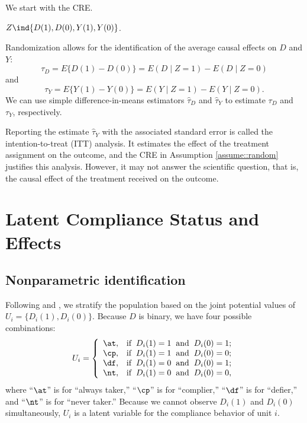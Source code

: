 We start with the CRE. 
\begin{assumption}[randomization]
\label{assume::random}
$Z\ind \{D(1), D(0) ,Y(1), Y(0)   \}$. 
\end{assumption}

Randomization allows for the identification of the average causal effects on $D$ and $Y$:
$$
\tau_D = E\{  D(1) - D(0) \} = E(D\mid Z=1) - E(D \mid Z=0)
$$
and
$$
\tau_Y = E\{  Y(1) - Y(0) \} = E(Y\mid Z=1) - E(Y\mid Z=0).  
$$
We can use simple difference-in-means estimators $\hat{\tau}_D$ and $\hat{\tau}_Y$ to estimate $\tau_D$ and $\tau_Y$, respectively. 


Reporting the estimate $\hat{\tau}_Y$ with the associated standard error is called the intention-to-treat (ITT) analysis. It estimates the effect of the treatment assignment on the outcome, and the CRE in Assumption \ref{assume::random} justifies this analysis. However, it may not answer the scientific question, that is, the causal effect of the treatment received on the outcome. 




\section{Latent Compliance Status and Effects}

\subsection{Nonparametric identification}


Following \citet{imbens1994identification} and \citet{angrist1996identification}, we stratify the population based on the joint potential values of $U_i = \{  D_i(1), D_i(0) \}$. Because $D$ is binary, we have four possible combinations:
\begin{eqnarray*}
U_i=\left \{ \begin{array} {ll}
\at  , & \text{if} \hspace{2mm} D_i(1)=1 \hspace{2mm} \text{and} \hspace{2mm} D_i(0)=1; \\
\cp  , & \text{if} \hspace{2mm} D_i(1)=1 \hspace{2mm} \text{and} \hspace{2mm} D_i(0)=0; \\
\df  ,& \text{if} \hspace{2mm} D_i(1)=0 \hspace{2mm} \text{and} \hspace{2mm} D_i(0)=1; \\
\nt  , & \text{if} \hspace{2mm} D_i(1)=0 \hspace{2mm} \text{and} \hspace{2mm} D_i(0)=0,
\end{array}
\right.  
\end{eqnarray*}
where ``$\at$'' is for ``always taker,'' ``$\cp$'' is for ``complier,'' ``$\df$'' is for ``defier,'' and ``$\nt$'' is for ``never taker.'' 
Because we cannot observe $D_i(1)$ and $D_i(0)$ simultaneously, $U_i$ is a latent variable for the compliance behavior of unit $i$. 


